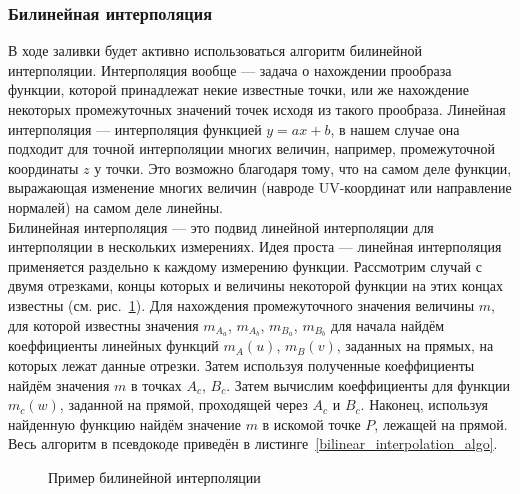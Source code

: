 \documentclass[a4paper,12pt]{report}
\numberwithin{equation}{section}
\begin{document}
\subsubsection{Билинейная интерполяция} \label{bilinear_interpolation_section}
В ходе заливки будет активно использоваться алгоритм билинейной интерполяции. Интерполяция вообще --- задача о нахождении прообраза функции, которой принадлежат некие известные точки, или же нахождение некоторых промежуточных значений точек исходя из такого прообраза. Линейная интерполяция --- интерполяция функцией $y=ax+b$, в нашем случае она подходит для точной интерполяции многих величин, например, промежуточной координаты $z$ у точки. Это возможно благодаря тому, что на самом деле функции, выражающая изменение многих величин (навроде UV-координат или направление нормалей) на самом деле линейны. \\
Билинейная интерполяция --- это подвид линейной интерполяции для интерполяции в нескольких измерениях. Идея проста --- линейная интерполяция применяется раздельно к каждому измерению функции. Рассмотрим случай с двумя отрезками, концы которых и величины некоторой функции на этих концах известны (см. рис.~\ref{bilinear_interpolation_img}). Для нахождения промежуточного значения величины $m$, для которой известны значения $m_{A_a}$, $m_{A_b}$, $m_{B_a}$, $m_{B_b}$ для начала найдём коеффициенты линейных функций $m_A(u)$, $m_B(v)$, заданных на прямых, на которых лежат данные отрезки. Затем используя полученные коеффициенты найдём значения $m$ в точках $A_c$, $B_c$. Затем вычислим коеффициенты для функции $m_c(w)$, заданной на прямой, проходящей через $A_c$ и $B_c$. Наконец, используя найденную функцию найдём значение $m$ в искомой точке $P$, лежащей на прямой. Весь алгоритм в псевдокоде приведён в листинге~\ref{bilinear_interpolation_algo}.

\begin{figure}[!h]
\centering
{}
\caption{Пример билинейной интерполяции}
\label{bilinear_interpolation_img}
\end{figure}
\end{document}
